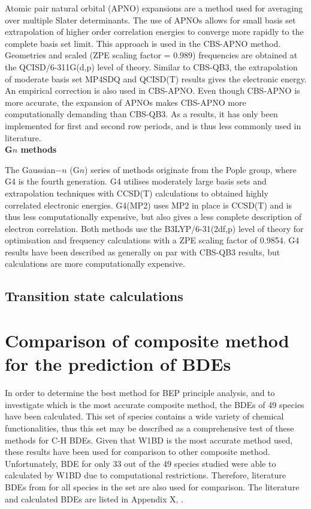 Atomic pair natural orbital (APNO) expansions are a method used for averaging over multiple Slater determinants. The use of APNOs allows for small basis set extrapolation of higher order correlation energies to converge more rapidly to the complete basis set limit. This approach is used in the CBS-APNO method.\cite{Ochterski1996} Geometries and scaled (ZPE scaling factor = 0.989) frequencies are obtained at the QCISD/6-311G(d,p) level of theory. Similar to CBS-QB3, the extrapolation of moderate basis set MP4SDQ and QCISD(T) results gives the electronic energy. An empirical correction is also used in CBS-APNO. Even though CBS-APNO is more accurate, the expansion of APNOs makes CBS-APNO more computationally demanding than CBS-QB3. As a results, it has only been implemented for first and second row periods, and is thus less commonly used in literature.
\\

\noindent \textbf{G$n$ methods}

The Gaussian$-n$ (G$n$) series of methods originate from the Pople group,\cite{Pople1989} where G4 is the fourth generation. G4 utilises moderately large basis sets and extrapolation techniques with CCSD(T) calculations to obtained highly correlated electronic energies. G4(MP2) uses MP2 in place is CCSD(T) and is thus less computationally expensive, but also gives a less complete description of electron correlation. Both methods use the B3LYP/6-31(2df,p) level of theory for optimisation and frequency calculations with a ZPE scaling factor of 0.9854. G4 results have been described as generally on par with CBS-QB3 results,\cite{Somers2015, Simmie2015} but calculations are more computationally expensive.

\subsection{Transition state calculations}

\section{Comparison of composite method for the prediction of BDEs}

In order to determine the best method for BEP principle analysis, and to investigate which is the most accurate composite method, the BDEs of 49 species have been calculated. This set of species contains a wide variety of chemical functionalities, thus this set may be described as a comprehensive test of these methods for C-H BDEs. Given that W1BD is the most accurate method used, these results have been used for comparison to other composite method. Unfortunately, BDE for only 33 out of the 49 species studied were able to calculated by W1BD due to computational restrictions. Therefore, literature BDEs from \citet{Luo2002} for all species in the set are also used for comparison. The literature and calculated BDEs are listed in Appendix X, .

